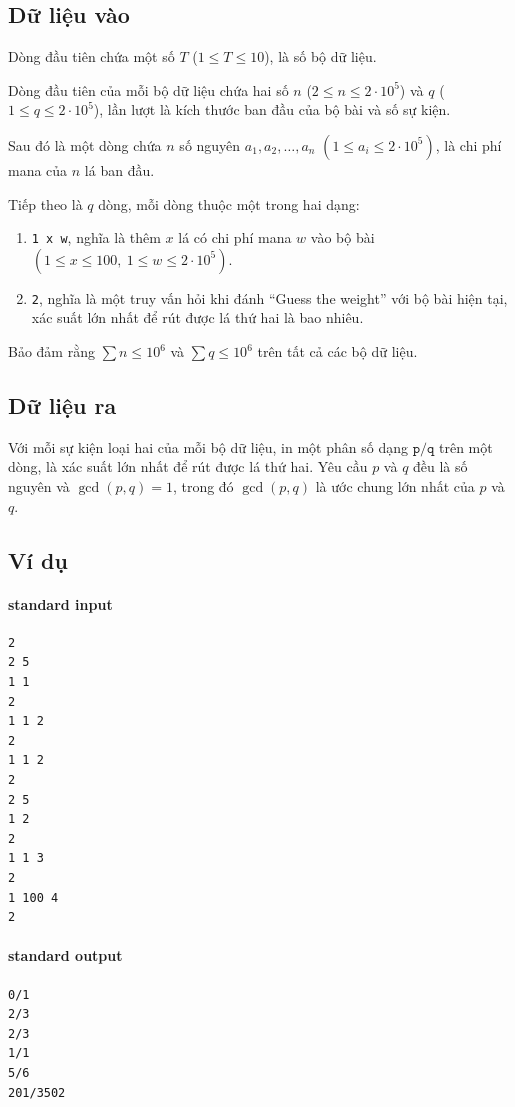 \documentclass[11pt]{article}
\begin{document}
\subsection*{Dữ liệu vào}

Dòng đầu tiên chứa một số \(T\) (\(1\le T\le 10\)), là số bộ dữ liệu.

Dòng đầu tiên của mỗi bộ dữ liệu chứa hai số \(n\) (\(2\le n\le 2\cdot 10^5\))
và \(q\) (\(1\le q\le 2\cdot 10^5\)), lần lượt là kích thước ban đầu của bộ
bài và số sự kiện.

Sau đó là một dòng chứa \(n\) số nguyên \(a_1,a_2,\ldots,a_n\)
\((1\le a_i\le 2\cdot 10^5)\), là chi phí mana của \(n\) lá ban đầu.

Tiếp theo là \(q\) dòng, mỗi dòng thuộc một trong hai dạng:
\begin{enumerate}
  \item \texttt{1 x w}, nghĩa là thêm \(x\) lá có chi phí mana \(w\) vào bộ
  bài \((1\le x\le 100,\ 1\le w\le 2\cdot 10^5)\).
  \item \texttt{2}, nghĩa là một truy vấn hỏi khi đánh ``Guess the weight''
  với bộ bài hiện tại, xác suất lớn nhất để rút được lá thứ hai là bao nhiêu.
\end{enumerate}

Bảo đảm rằng \(\sum n\le 10^6\) và \(\sum q\le 10^6\) trên tất cả các bộ dữ
liệu.

\subsection*{Dữ liệu ra}

Với mỗi sự kiện loại hai của mỗi bộ dữ liệu, in một phân số dạng
\(\texttt{p/q}\) trên một dòng, là xác suất lớn nhất để rút được lá thứ hai.
Yêu cầu \(p\) và \(q\) đều là số nguyên và \(\gcd(p,q)=1\), trong đó
\(\gcd(p,q)\) là ước chung lớn nhất của \(p\) và \(q\).

\subsection*{Ví dụ}

\paragraph{standard input}
\begin{verbatim}
2
2 5
1 1
2
1 1 2
2
1 1 2
2
2 5
1 2
2
1 1 3
2
1 100 4
2
\end{verbatim}

\paragraph{standard output}
\begin{verbatim}
0/1
2/3
2/3
1/1
5/6
201/3502
\end{verbatim}
\end{document}
